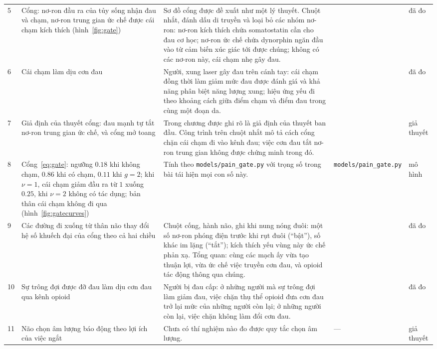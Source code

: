 {\begin{longtable}{>{\raggedright}p{0.5cm}>{\raggedright}p{4.0cm}>{\raggedright}p{5.6cm}>{\raggedright}p{2.3cm}>{\raggedright\arraybackslash}p{1.7cm}}
5 & Cổng: nơ-ron đầu ra của tủy sống nhận đau và chạm, nơ-ron trung gian ức chế được cái chạm kích thích (hình~\ref{fig:gate}) & Sơ đồ cổng được đề xuất như một lý thuyết. Chuột nhắt, đánh dấu di truyền và loại bỏ các nhóm nơ-ron: nơ-ron kích thích chứa somatostatin cần cho đau cơ học; nơ-ron ức chế chứa dynorphin ngăn đầu vào từ cảm biến xúc giác tới được chúng; không có các nơ-ron này, cái chạm nhẹ gây đau. & \cite{MelzackWall1965, Duan2014} & đã đo \\
6 & Cái chạm làm dịu cơn đau & Người, xung laser gây đau trên cánh tay: cái chạm đồng thời làm giảm mức đau được đánh giá và khả năng phân biệt năng lượng xung; hiệu ứng yếu đi theo khoảng cách giữa điểm chạm và điểm đau trong cùng một đoạn da. & \cite{Mancini2014touch} & đã đo \\
7 & Giả định của thuyết cổng: đau mạnh tự tắt nơ-ron trung gian ức chế, và cổng mở toang & Trong chương được ghi rõ là giả định của thuyết ban đầu. Công trình trên chuột nhắt mô tả cách cổng chặn cái chạm đi vào kênh đau; việc cơn đau tắt nơ-ron trung gian không được chứng minh trong đó. & \cite{MelzackWall1965} & giả thuyết \\
8 & Cổng~\eqref{eq:gate}: ngưỡng $0.18$ khi không chạm, $0.86$ khi có chạm, $0.11$ khi $g=2$; khi $\nu=1$, cái chạm giảm đầu ra từ $1$ xuống $0.25$, khi $\nu=2$ không có tác dụng; bản thân cái chạm không đi qua (hình~\ref{fig:gatecurves}) & Tính theo \texttt{models/\allowbreak pain\_\allowbreak gate.py} với trọng số trong bài tái hiện mọi con số này. & \texttt{models/\allowbreak pain\_\allowbreak gate.py} & mô hình \\
9 & Các đường đi xuống từ thân não thay đổi hệ số khuếch đại của cổng theo cả hai chiều & Chuột cống, hành não, ghi khi nung nóng đuôi: một số nơ-ron phóng điện trước khi rụt đuôi (``bật''), số khác im lặng (``tắt''); kích thích yếu vùng này ức chế phản xạ. Tổng quan: cùng các mạch ấy vừa tạo thuận lợi, vừa ức chế việc truyền cơn đau, và opioid tác động thông qua chúng. & \cite{Fields1983rvm, Fields2004} & đã đo \\
10 & Sự trông đợi được đỡ đau làm dịu cơn đau qua kênh opioid & Người bị đau cấp: ở những người mà sự trông đợi làm giảm đau, việc chặn thụ thể opioid đưa cơn đau trở lại mức của những người còn lại; ở những người còn lại, việc chặn không làm đổi cơn đau. & \cite{Levine1978} & đã đo \\
11 & Não chọn âm lượng báo động theo lợi ích của việc ngắt & Chưa có thí nghiệm nào đo được quy tắc chọn âm lượng. & --- & giả thuyết \\

\end{longtable}}
